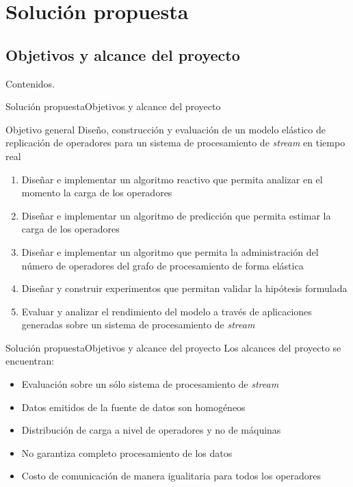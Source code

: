 \section{Solución propuesta}
\subsection*{Objetivos y alcance del proyecto}

\addtocounter{framenumber}{-1}
\begin{frame}[t]{Contenidos}{\textcolor{UniBlue}{.}}
	\tableofcontents[currentsection]
\end{frame}

\begin{frame}{Solución propuesta}{Objetivos y alcance del proyecto}

\begin{alertblock}{Objetivo general}
Dise\~no, construcción y evaluaci\'on de un modelo elástico de replicación de operadores para un sistema de procesamiento de \textit{stream} en tiempo real
\end{alertblock}

\pause
\begin{enumerate}
	\item Dise\~nar e implementar un algoritmo reactivo que permita analizar en el momento la carga de los operadores
	\pause
	\item Dise\~nar e implementar un algoritmo de predicci\'on que permita estimar la carga de los operadores
	\pause
	\item Dise\~nar e implementar un algoritmo que permita la administraci\'on del número de operadores del grafo de procesamiento de forma el\'astica
	\pause
	\item Dise\~nar y construir experimentos que permitan validar la hip\'otesis formulada
	\pause
	\item Evaluar y analizar el rendimiento del modelo a trav\'es de aplicaciones generadas sobre un sistema de procesamiento de \textit{stream}
\end{enumerate}
\end{frame}

\begin{frame}{Solución propuesta}{Objetivos y alcance del proyecto}
Los alcances del proyecto se encuentran:
\begin{itemize}
	\item Evaluación sobre un sólo sistema de procesamiento de \textsl{stream}
	\item Datos emitidos de la fuente de datos son homogéneos
	\item Distribución de carga a nivel de operadores y no de máquinas
	\item No garantiza completo procesamiento de los datos
	\item Costo de comunicación de manera igualitaria para todos los operadores
\end{itemize}
\end{frame}